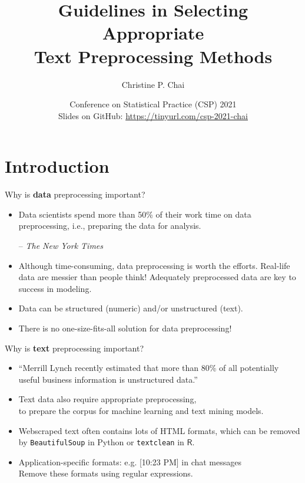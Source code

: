 \documentclass{beamer}
\title [Text Preprocessing Methods] %
{Guidelines in Selecting Appropriate\\ Text Preprocessing Methods}
\author [chrchai@microsoft.com] %
{Christine P. Chai}
\institute[]
{Microsoft\\ chrchai@microsoft.com}
\date[tinyurl.com/csp-2021-chai] %
{Conference on Statistical Practice (CSP) 2021\\ \vspace{40pt}
\footnotesize{Slides on GitHub: \url{https://tinyurl.com/csp-2021-chai}}}
\renewcommand{\cite}{\citep}
\begin{document}
\begin{frame}
  \titlepage
\end{frame}




\section{Introduction}

\begin{frame}{Why is \textbf{\color{yellow}data} preprocessing important?}
\begin{itemize}
\item Data scientists spend more than 50\% of their work time on data preprocessing, i.e., preparing the data for analysis.\\
\begin{flushright}
-- \textit{The New York Times}~\cite{lohr2014bigdata}
\end{flushright}
	\bigskip
\item Although time-consuming, data preprocessing is worth the efforts. Real-life data are messier than people think! Adequately preprocessed data are key to success in modeling.~\cite{chai2020importance}
	\bigskip
\item Data can be structured (numeric) and/or unstructured (text).
\item There is no one-size-fits-all solution for data preprocessing!
\end{itemize}
\end{frame}

\begin{frame}{Why is \textbf{\color{yellow}text} preprocessing important?}
\begin{itemize}
\item ``Merrill Lynch recently estimated that more than 80\% of all potentially useful business information is unstructured data.''~\cite{gharehchopogh2011analysis}
	\bigskip
\item Text data also require appropriate preprocessing,\\ to prepare the corpus for machine learning and text mining models.~\cite{kalra2018importance}
	\bigskip
\item Webscraped text often contains lots of HTML formats, which can be removed by \texttt{BeautifulSoup} in Python or \texttt{textclean} in $\mathsf{R}$.
\item Application-specific formats: e.g. [10:23 PM] in chat messages\\
	Remove these formats using regular expressions.
\end{itemize}
\end{frame}
\end{document}
